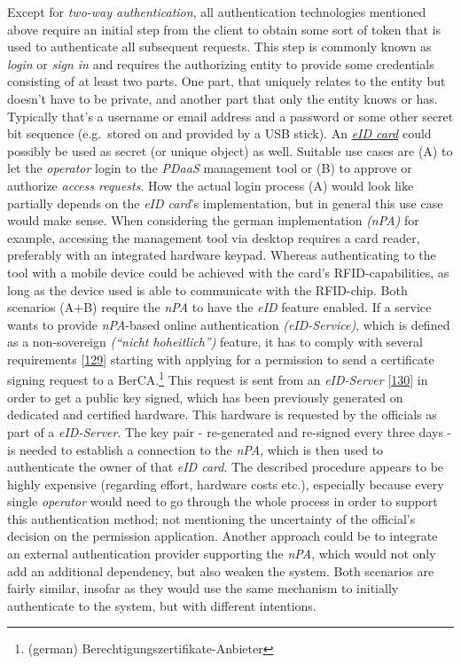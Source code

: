\documentclass[12pt,english,a4paper,titlepage,cleardoublepage=empty,dottedtoc]{report}
\begin{document}
Except for \emph{two-way authentication}, all authentication
technologies mentioned above require an initial step from the client to
obtain some sort of token that is used to authenticate all subsequent
requests. This step is commonly known as \emph{login} or \emph{sign in}
and requires the authorizing entity to provide some credentials
consisting of at least two parts. One part, that uniquely relates to the
entity but doesn't have to be private, and another part that only the
entity knows or has. Typically that's a username or email address and a
password or some other secret bit sequence (e.g.~stored on and provided
by a USB stick). An \emph{\protect\hyperlink{def--eid-card}{eID card}}
could possibly be used as secret (or unique object) as well. Suitable
use cases are (A) to let the \emph{operator} login to the \emph{PDaaS}
management tool or (B) to approve or authorize \emph{access requests}.
How the actual login process (A) would look like partially depends on
the \emph{eID card}'s implementation, but in general this use case would
make sense. When considering the german implementation \emph{(nPA)} for
example, accessing the management tool via desktop requires a card
reader, preferably with an integrated hardware keypad. Whereas
authenticating to the tool with a mobile device could be achieved with
the card's RFID-capabilities, as long as the device used is able to
communicate with the RFID-chip. Both scenarios (A+B) require the
\emph{nPA} to have the \emph{eID} feature enabled. If a service wants to
provide \emph{nPA}-based online authentication \emph{(eID-Service)},
which is defined as a non-sovereign \emph{(``nicht hoheitlich'')}
feature, it has to comply with several requirements
{[}\protect\hyperlink{ref-web_bsi-spec_eid}{129}{]} starting with
applying for a permission to send a certificate signing request to a
BerCA.\footnote{(german) Berechtigungszertifikate-Anbieter} This request
is sent from an \emph{eID-Server}
{[}\protect\hyperlink{ref-web_2017_npa-eid-server}{130}{]} in order to
get a public key signed, which has been previously generated on
dedicated and certified hardware. This hardware is requested by the
officials as part of a \emph{eID-Server}. The key pair - re-generated
and re-signed every three days - is needed to establish a connection to
the \emph{nPA}, which is then used to authenticate the owner of that
\emph{eID card}. The described procedure appears to be highly expensive
(regarding effort, hardware costs etc.), especially because every single
\emph{operator} would need to go through the whole process in order to
support this authentication method; not mentioning the uncertainty of
the official's decision on the permission application. Another approach
could be to integrate an external authentication provider supporting the
\emph{nPA}, which would not only add an additional dependency, but also
weaken the system. Both scenarios are fairly similar, insofar as they
would use the same mechanism to initially authenticate to the system,
but with different intentions.
\end{document}
